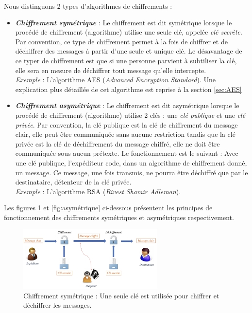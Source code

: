 \documentclass[10pt, oneside, a4paper]{article}
\begin{document}
\newpage

Nous distinguons 2 types d'algorithmes de chiffrements : 
\begin{itemize}
\item \textbf{\textit{Chiffrement symétrique}} : Le chiffrement est dit symétrique lorsque le procédé de chiffrement (algorithme) utilise une seule clé, appelée \textit{clé secrète}. Par convention, ce type de chiffrement permet à la fois de chiffrer et de déchiffrer des messages à partir d'une seule et unique clé. Le désavantage de ce typer de chiffrement est que si une personne parvient à subtiliser la clé, elle sera en mesure de déchiffrer tout message qu'elle intercepte.  \\
\textit{Exemple} : L'algorithme AES (\textit{Advanced Encryption Standard}). Une explication plus détaillée de cet algorithme est reprise à la section \ref{sec:AES}
\item \textbf{\textit{Chiffrement asymétrique}} : Le chiffrement est dit asymétrique lorsque le procédé de chiffrement (algorithme) utilise 2 clés : une \textit{clé publique} et une \textit{clé privée}. Par convention, la clé publique est la clé de chiffrement du message clair, elle peut être communiquée sans aucune restriction tandis que la clé privée est la clé de déchiffrement du message chiffré, elle ne doit être communiquée sous aucun prétexte. Le fonctionnement est le suivant : Avec une clé publique, l'expéditeur code, dans un algorithme de chiffrement donné, un message. Ce message, une fois transmis, ne pourra être déchiffré que par le destinataire, détenteur de la clé privée. \\
\textit{Exemple} : L'algorithme RSA (\textit{Rivest Shamir Adleman}). \\
\end{itemize}

Les figures \ref{fig:symétrique} et \ref{fig:asymétrique} ci-dessous présentent les principes de fonctionnement des chiffrements symétriques et asymétriques respectivement.

\begin{figure}[htbp]
    \centering
    \includegraphics[width=0.65\textwidth]{image/symetrique}
    \caption{Chiffrement symétrique : Une seule clé est utilisée pour chiffrer et déchiffrer les messages.}
    \label{fig:symétrique}
\end{figure}
\end{document}
